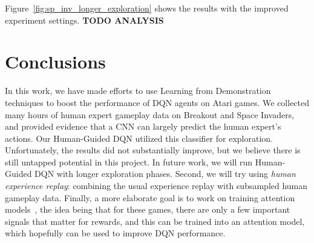 \documentclass[letterpaper, 10pt, conference]{ieeeconf}
\begin{document}
Figure~\ref{fig:sp_inv_longer_exploration} shows the results with the improved
experiment settings. \textbf{TODO ANALYSIS}




\section{Conclusions}\label{sec:conclusions}

In this work, we have made efforts to use Learning from Demonstration techniques
to boost the performance of DQN agents on Atari games. We collected many hours
of human expert gameplay data on Breakout and Space Invaders, and provided
evidence that a CNN can largely predict the human expert's actions. Our
Human-Guided DQN utilized this classifier for exploration. Unfortunately, the
results did not substantially improve, but we believe there is still untapped
potential in this project. In future work, we will run Human-Guided DQN with
longer exploration phases. Second, we will try using \emph{human experience
replay}: combining the usual experience replay with subsampled human gameplay
data. Finally, a more elaborate goal is to work on training attention
models~\cite{NIPS2014_5542,icml2015_xuc15}, the idea being that for these games,
there are only a few important signals that matter for rewards, and this can be
trained into an attention model, which hopefully can be used to improve DQN
performance.



\end{document}
